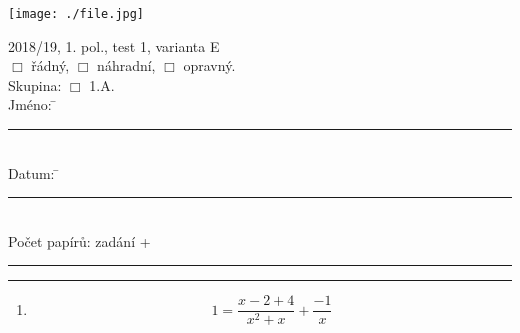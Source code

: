 \documentclass[czech, a4paper, 12pt]{exam}
\begin{document}
\begin{minipage}{9cm}
    \texttt{[image: ./file.jpg]}
\end{minipage}
\begin{minipage}{5cm}
\begin{tabbing}
2018/19, 1. pol., test 1, varianta E\\[.1cm]
$\Box$ řádný, \hspace{.2cm} $\Box$ náhradní, \hspace{.2cm} $\Box$ opravný. \\[.1cm]
Skupina:
    $\Box$ 1.A. \\[.1cm]
Jméno: \hspace{2cm} \= \rule{4.7cm}{.1mm} \\[.1cm]
Datum: \hspace{2cm} \= \rule{4.7cm}{.1mm} \\[.1cm]
Počet papírů:\> zadání + \rule{1.2cm}{.1mm}
\end{tabbing}
\end{minipage}

\vspace{.3cm}
\begin{center}
\rule{17cm}{.7mm}
\end{center}
\vspace{.3cm}



\begin{enumerate}


    \item
    $$ 1 = \frac{x - 2 + 4}{x^2 + x} + \frac{-1}{x} $$




\end{enumerate}
\end{document}
